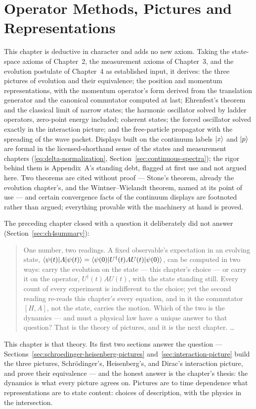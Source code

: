 \chapter{Operator Methods, Pictures and Representations}

\begin{note}
    This chapter is deductive in character and adds no new axiom. Taking the state-space axioms of Chapter~2, the measurement axioms of Chapter~3, and the evolution postulate of Chapter~4 as established input, it derives: the three pictures of evolution and their equivalence; the position and momentum representations, with the momentum operator's form derived from the translation generator and the canonical commutator computed at last; Ehrenfest's theorem and the classical limit of narrow states; the harmonic oscillator solved by ladder operators, zero-point energy included; coherent states; the forced oscillator solved exactly in the interaction picture; and the free-particle propagator with the spreading of the wave packet. Displays built on the continuum labels $\ket{x}$ and $\ket{p}$ are formal in the licensed-shorthand sense of the states and measurement chapters (\eqref{eq:delta-normalization}, Section~\ref{sec:continuous-spectra}); the rigor behind them is Appendix~A's standing debt, flagged at first use and not argued here. Two theorems are cited without proof --- Stone's theorem, already the evolution chapter's, and the Wintner--Wielandt theorem, named at its point of use --- and certain convergence facts of the continuum displays are footnoted rather than argued; everything provable with the machinery at hand is proved.
\end{note}

The preceding chapter closed with a question it deliberately did not answer (Section~\ref{sec:ch4summary}):
\begin{quote}
    One number, two readings. A fixed observable's expectation in an evolving state, $\braket{\psi(t)|A|\psi(t)} = \braket{\psi(0)|U^\dagger(t)AU(t)|\psi(0)}$, can be computed in two ways: carry the evolution on the state --- this chapter's choice --- or carry it on the operator, $U^\dagger(t)AU(t)$, with the state standing still. Every count of every experiment is indifferent to the choice; yet the second reading re-reads this chapter's every equation, and in it the commutator $[H,A]$, not the state, carries the motion. Which of the two is the dynamics --- and must a physical law have a unique answer to that question? That is the theory of pictures, and it is the next chapter. \ldots
\end{quote}
This chapter is that theory. Its first two sections answer the question --- Sections~\ref{sec:schroedinger-heisenberg-pictures} and~\ref{sec:interaction-picture} build the three pictures, Schr\"odinger's, Heisenberg's, and Dirac's interaction picture, and prove their equivalence --- and the honest answer is the chapter's thesis: the dynamics is what every picture agrees on. Pictures are to time dependence what representations are to state content: choices of description, with the physics in the intersection.

